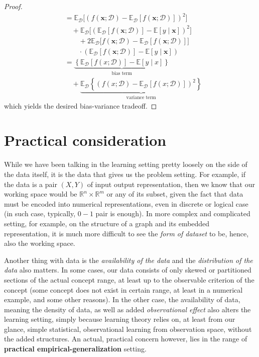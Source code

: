 \begin{proof}
\begin{equation}
\begin{split}
            & = \mathbb{E}_{\mathcal{D}} \Big[(f(\mathbf{x};\mathcal{D})-\mathbb{E}_{\mathcal{D}}[f(\mathbf{x};\mathcal{D})])^{2}\Big] \\
            &\quad + \mathbb{E}_{\mathcal{D}} \Big[ (\mathbb{E}_{\mathcal{D}} [f(\mathbf{x};\mathcal{D})] - \mathbb{E}[y\mid \mathbf{x}])^{2} \Big] \\
            &\quad \quad +2\mathbb{E}_{\mathcal{D}}\Big[f(\mathbf{x};\mathcal{D})-\mathbb{E}_{\mathcal{D}}[f(\mathbf{x};\mathcal{D})]\Big]\\
            &\quad \quad \cdot (\mathbb{E}_{\mathcal{D}}[f(\mathbf{x};\mathcal{D})]-\mathbb{E}[y\mid \mathbf{x}]) \\
            & = \underbrace{\left\{ \mathbb{E}_{\mathcal{D}}[f(x;\mathcal{D})] - \mathbb{E}[y\mid x] \right\}}_{\text{bias term}} \\
            &\quad + \underbrace{\mathbb{E}_{\mathcal{D}} \left\{(f(x;\mathcal{D})- \mathbb{E}_{\mathcal{D}}[f(x;\mathcal{D})])^{2}\right\}}_{\text{variance term}}
        \end{split}
    \end{equation}
    which yields the desired bias-variance tradeoff. 
\end{proof}

\section{Practical consideration}

While we have been talking in the learning setting pretty loosely on the side of the data itself, it is the data that gives us the problem setting. For example, if the data is a pair $(X,Y)$ of input output representation, then we know that our working space would be $\mathbb{R}^n \times \mathbb{R}^m$ or any of its subset, given the fact that data must be encoded into numerical representations, even in discrete or logical case (in such case, typically, $0-1$ pair is enough). In more complex and complicated setting, for example, on the structure of a graph and its embedded representation, it is much more difficult to see the \textit{form of dataset} to be, hence, also the working space. 

Another thing with data is the \textit{availability of the data} and the \textit{distribution of the data} also matters. In some cases, our data consists of only skewed or partitioned sections of the actual concept range, at least up to the observable criterion of the concept (some concept does not exist in certain range, at least in a numerical example, and some other reasons). In the other case, the availability of data, meaning the density of data, as well as added \textit{observational effect} also alters the learning setting, simply because learning theory relies on, at least from our glance, simple statistical, observational learning from observation space, without the added structures. An actual, practical concern however, lies in the range of \textbf{practical empirical-generalization} setting. 

